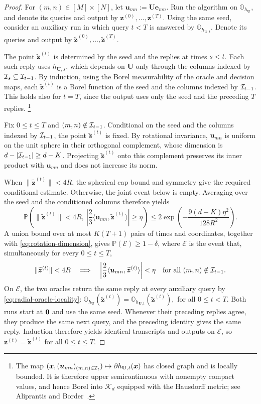 \begin{proof}
For $(m,n)\in[M]\times[N]$, let
$\bm u_{mn}:=\mathbf U\bm e_{mn}$.
Run the algorithm on $\mathbb O_{h_{\mathbf U}}$,
and denote its queries and output by
$\bm z^{(0)},\ldots,\bm z^{(T)}$.
Using the same seed, consider an auxiliary run
in which query $t<T$ is answered by
$\mathbb O_{h_{\mathbf U,t}}$.
Denote its queries and output by
$\widetilde{\bm z}^{(0)},\ldots,
\widetilde{\bm z}^{(T)}$.

The point $\widetilde{\bm z}^{(t)}$ is determined
by the seed and the replies at times $s<t$.
Each such reply uses $h_{\mathbf U,s}$, which
depends on $\mathbf U$ only through the columns
indexed by ${\cal I}_s\subseteq{\cal I}_{t-1}$.
By induction, using the Borel measurability of
the oracle and decision maps, each
$\widetilde{\bm z}^{(t)}$ is a Borel function of
the seed and the columns indexed by ${\cal I}_{t-1}$.
This holds also for $t=T$, since the output uses
only the seed and the preceding $T$ replies.
\footnote{The map
$(\bm x,(\bm u_{mn})_{(m,n)\in{\cal I}_t})\mapsto\partial h_{\mathbf U,t}(\bm x)$
has closed graph and is locally bounded. It is therefore upper
semicontinuous with nonempty compact values, and hence Borel into
$\mathcal K_d$ equipped with the Hausdorff metric; see Aliprantis and
Border~\cite[Ch.~18]{aliprantis2006infinite}.}

Fix $0\le t\le T$ and $(m,n)\notin{\cal I}_{t-1}$.
Conditional on the seed and the columns indexed
by ${\cal I}_{t-1}$, the point
$\widetilde{\bm z}^{(t)}$ is fixed.
By rotational invariance, $\bm u_{mn}$ is uniform
on the unit sphere in their orthogonal complement,
whose dimension is $d-|{\cal I}_{t-1}|\ge d-K$.
Projecting $\widetilde{\bm z}^{(t)}$ onto this
complement preserves its inner product with
$\bm u_{mn}$ and does not increase its norm.

When $\|\widetilde{\bm z}^{(t)}\|<4R$,
the spherical cap bound
\cite[Lemma~2.2]{ball1997elementary} and symmetry
give the required conditional estimate.
Otherwise, the joint event below is empty.
Averaging over the seed and the conditioned columns
therefore yields
\[
 \mathbb P\left(
 \|\widetilde{\bm z}^{(t)}\|<4R,\ 
 \left|\frac23
 \langle\bm u_{mn},\widetilde{\bm z}^{(t)}\rangle
 \right|\ge\eta
 \right)
 \le
 2\exp\left(
 -\frac{9(d-K)\eta^2}{128R^2}
 \right).
\]
A union bound over at most $K(T+1)$ pairs of
times and coordinates, together with
\eqref{eq:rotation-dimension}, gives
$\mathbb P(\mathcal E)\ge1-\delta$,
where $\mathcal E$ is the event that, simultaneously
for every $0\le t\le T$,
\[
 \|\widetilde{\bm z}^{(t)}\|<4R
 \quad\Longrightarrow\quad
 \left|\frac23
 \langle\bm u_{mn},\widetilde{\bm z}^{(t)}\rangle
 \right|<\eta
 \quad\text{for all }(m,n)\notin{\cal I}_{t-1}.
\]
On $\mathcal E$, the two oracles return the same reply
at every auxiliary query by
\eqref{eq:radial-oracle-locality}: $\mathbb O_{h_{\mathbf U}}(\widetilde{\bm z}^{(t)})
 =
 \mathbb O_{h_{\mathbf U,t}}(\widetilde{\bm z}^{(t)}),$ for all $0\le t<T$. 
Both runs start at ${\mathbf 0}$ and use the same seed.
Whenever their preceding replies agree, they produce
the same next query, and the preceding identity gives
the same reply.
Induction therefore yields identical transcripts
and outputs on $\mathcal E$, so
$\bm z^{(t)}=\widetilde{\bm z}^{(t)}$
for all $0\le t\le T$.



\end{proof}
